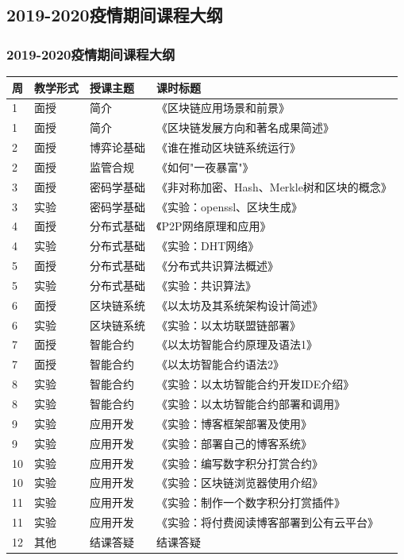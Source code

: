 \documentclass[11pt]{beamer}
\begin{document}
	\subsection{2019-2020疫情期间课程大纲}
	\begin{frame}[allowframebreaks]
		\frametitle{2019-2020疫情期间课程大纲}

		\begin{longtable}{llll}
			\hline
			周  & 教学形式 & 授课主题  & 课时标题                       \\ \hline
			\endfirsthead
			\endhead
			\hline
			\endfoot
			\endlastfoot
			1  & 面授   & 简介    & 《区块链应用场景和前景》               \\
			1  & 面授   & 简介    & 《区块链发展方向和著名成果简述》           \\
			2  & 面授   & 博弈论基础 & 《谁在推动区块链系统运行》              \\
			2  & 面授   & 监管合规  & 《如何"一夜暴富"》                 \\
			3  & 面授   & 密码学基础 & \small{《非对称加密、Hash、Merkle树和区块的概念》} \\
			3  & 实验   & 密码学基础 & 《实验：openssl、区块生成》          \\
			4  & 面授   & 分布式基础 & 《P2P网络原理和应用》               \\
			4  & 实验   & 分布式基础 & 《实验：DHT网络》                 \\
			5  & 面授   & 分布式基础 & 《分布式共识算法概述》                \\
			5  & 实验   & 分布式基础 & 《实验：共识算法》                  \\
			6  & 面授   & 区块链系统 & 《以太坊及其系统架构设计简述》            \\
			6  & 实验   & 区块链系统 & 《实验：以太坊联盟链部署》              \\
			7  & 面授   & 智能合约  & 《以太坊智能合约原理及语法1》            \\
			7  & 面授   & 智能合约  & 《以太坊智能合约语法2》               \\
			8  & 实验   & 智能合约  & 《实验：以太坊智能合约开发IDE介绍》        \\
			8  & 实验   & 智能合约  & 《实验：以太坊智能合约部署和调用》          \\
			9  & 实验   & 应用开发  & 《实验：博客框架部署及使用》             \\
			9  & 实验   & 应用开发  & 《实验：部署自己的博客系统》             \\
			10 & 实验   & 应用开发  & 《实验：编写数字积分打赏合约》            \\
			10 & 实验   & 应用开发  & 《实验：区块链浏览器使用介绍》            \\
			11 & 实验   & 应用开发  & 《实验：制作一个数字积分打赏插件》          \\
			11 & 实验   & 应用开发  & \small{《实验：将付费阅读博客部署到公有云平台》}    \\
			12 & 其他   & 结课答疑  & 结课答疑                       \\ \hline
		\end{longtable}
	\end{frame}
\end{document}
